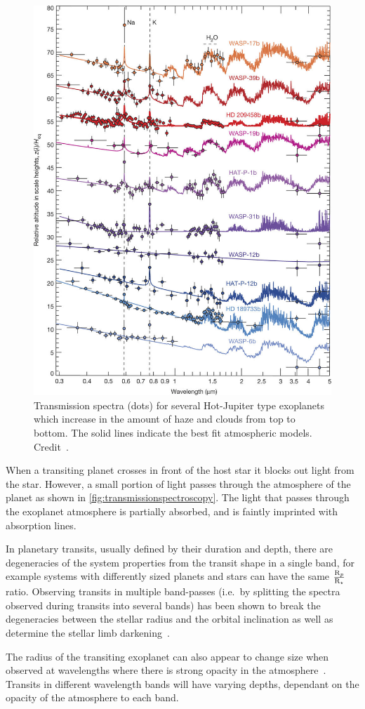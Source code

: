 \begin{figure}
    \centering
    \includegraphics[width=0.6\linewidth]{figures/introduction/transmissionSpec_Sing2016}
    \caption[Transmission spectra for several Hot-Jupiter exoplanets.]{Transmission spectra (dots) for several Hot-Jupiter type exoplanets which increase in the amount of haze and clouds from top to bottom.
    The solid lines indicate the best fit atmospheric models.
    Credit~\citet{sing_continuum_2016}.}
    \label{fig:transmissionspecsing2016}
\end{figure}

When a transiting planet crosses in front of the host star it blocks out light from the star.
However, a small portion of light passes through the atmosphere of the planet as shown in \cref{fig:transmissionspectroscopy}.
The light that passes through the exoplanet atmosphere is partially absorbed, and is faintly imprinted with absorption lines.

In planetary transits, usually defined by their duration and depth, there are degeneracies of the system properties from the transit shape in a single band, for example systems with differently sized planets and stars can have the same \(\frac{\textrm{R}_{p}}{\textrm{R}_{\star}}\) ratio.
Observing transits in multiple band-passes (i.e.\ by splitting the spectra observed during transits into several bands) has been shown to break the degeneracies between the stellar radius and the orbital inclination as well as determine the stellar limb darkening~\citep{jha_multicolor_2000, knutson_using_2007}.

The radius of the transiting exoplanet can also appear to change size when observed at wavelengths where there is strong opacity in the atmosphere~\citep[e.g.][]{burrows_radii_2000, seager_theoretical_2000}.
Transits in different wavelength bands will have varying depths, dependant on the opacity of the atmosphere to each band.

